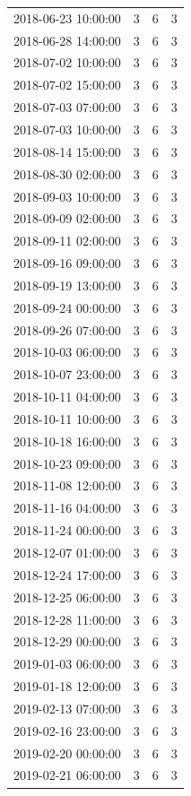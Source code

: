 \begin{tabular}{lrrr}
2018-06-23 10:00:00 & 3 & 6 & 3 \\
2018-06-28 14:00:00 & 3 & 6 & 3 \\
2018-07-02 10:00:00 & 3 & 6 & 3 \\
2018-07-02 15:00:00 & 3 & 6 & 3 \\
2018-07-03 07:00:00 & 3 & 6 & 3 \\
2018-07-03 10:00:00 & 3 & 6 & 3 \\
2018-08-14 15:00:00 & 3 & 6 & 3 \\
2018-08-30 02:00:00 & 3 & 6 & 3 \\
2018-09-03 10:00:00 & 3 & 6 & 3 \\
2018-09-09 02:00:00 & 3 & 6 & 3 \\
2018-09-11 02:00:00 & 3 & 6 & 3 \\
2018-09-16 09:00:00 & 3 & 6 & 3 \\
2018-09-19 13:00:00 & 3 & 6 & 3 \\
2018-09-24 00:00:00 & 3 & 6 & 3 \\
2018-09-26 07:00:00 & 3 & 6 & 3 \\
2018-10-03 06:00:00 & 3 & 6 & 3 \\
2018-10-07 23:00:00 & 3 & 6 & 3 \\
2018-10-11 04:00:00 & 3 & 6 & 3 \\
2018-10-11 10:00:00 & 3 & 6 & 3 \\
2018-10-18 16:00:00 & 3 & 6 & 3 \\
2018-10-23 09:00:00 & 3 & 6 & 3 \\
2018-11-08 12:00:00 & 3 & 6 & 3 \\
2018-11-16 04:00:00 & 3 & 6 & 3 \\
2018-11-24 00:00:00 & 3 & 6 & 3 \\
2018-12-07 01:00:00 & 3 & 6 & 3 \\
2018-12-24 17:00:00 & 3 & 6 & 3 \\
2018-12-25 06:00:00 & 3 & 6 & 3 \\
2018-12-28 11:00:00 & 3 & 6 & 3 \\
2018-12-29 00:00:00 & 3 & 6 & 3 \\
2019-01-03 06:00:00 & 3 & 6 & 3 \\
2019-01-18 12:00:00 & 3 & 6 & 3 \\
2019-02-13 07:00:00 & 3 & 6 & 3 \\
2019-02-16 23:00:00 & 3 & 6 & 3 \\
2019-02-20 00:00:00 & 3 & 6 & 3 \\
2019-02-21 06:00:00 & 3 & 6 & 3 \\

\end{tabular}
